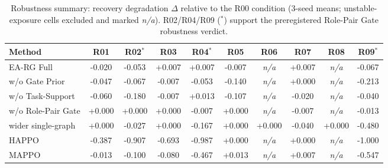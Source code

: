\begin{table}[t]
\centering
\footnotesize
\caption{Robustness summary: recovery degradation $\Delta$ relative to the R00 condition (3-seed means; unstable-exposure cells excluded and marked \emph{n/a}). R02/R04/R09 ($^*$) support the preregistered Role-Pair Gate robustness verdict.}
\label{tab:robustness}
\begin{tabular}{lccccccccc}
\toprule
Method & R01 & R02$^*$ & R03 & R04$^*$ & R05 & R06 & R07 & R08 & R09$^*$ \\
\midrule
EA-RG Full & -0.020 & -0.053 & +0.007 & +0.007 & -0.007 & \emph{n/a} & +0.007 & \emph{n/a} & -0.067 \\
w/o Gate Prior & -0.047 & -0.067 & -0.007 & -0.053 & -0.140 & \emph{n/a} & +0.000 & \emph{n/a} & -0.213 \\
w/o Task-Support & -0.060 & -0.180 & -0.007 & +0.013 & -0.107 & \emph{n/a} & -0.020 & \emph{n/a} & -0.040 \\
w/o Role-Pair Gate & +0.000 & +0.000 & +0.000 & -0.007 & +0.000 & \emph{n/a} & -0.007 & \emph{n/a} & -0.013 \\
wider single-graph & +0.000 & -0.027 & +0.000 & -0.167 & +0.000 & +0.000 & -0.040 & +0.000 & -0.480 \\
HAPPO & -0.387 & -0.907 & -0.693 & -0.987 & +0.000 & \emph{n/a} & +0.000 & \emph{n/a} & -1.000 \\
MAPPO & -0.013 & -0.100 & -0.080 & -0.467 & +0.013 & \emph{n/a} & +0.007 & \emph{n/a} & -0.547 \\
\bottomrule
\end{tabular}
\end{table}